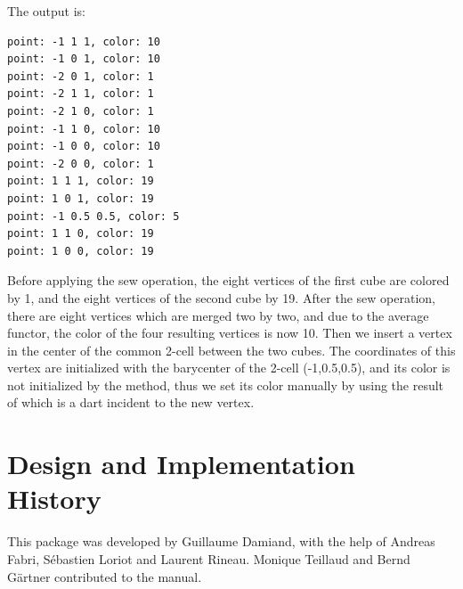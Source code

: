 
The output is:
\begin{verbatim}
point: -1 1 1, color: 10
point: -1 0 1, color: 10
point: -2 0 1, color: 1
point: -2 1 1, color: 1
point: -2 1 0, color: 1
point: -1 1 0, color: 10
point: -1 0 0, color: 10
point: -2 0 0, color: 1
point: 1 1 1, color: 19
point: 1 0 1, color: 19
point: -1 0.5 0.5, color: 5
point: 1 1 0, color: 19
point: 1 0 0, color: 19
\end{verbatim}

Before applying the sew operation, the eight vertices of the first
cube are colored by 1, and the eight vertices of the second cube by
19. After the sew operation, there are eight vertices which are merged
two by two, and due to the average functor, the color of the four
resulting vertices is now 10. Then we insert a vertex in the center
of the common 2-cell between the two cubes.  The coordinates of this
vertex are initialized with the barycenter of the 2-cell
(-1,0.5,0.5), and its color is not initialized by the method, thus we
set its color manually by using the result of
 which is a dart incident to the
new vertex.

\section{Design and Implementation History}

This package was developed by Guillaume Damiand, with the help of
Andreas Fabri, S\'ebastien Loriot and Laurent Rineau.  Monique
Teillaud and Bernd G{\"a}rtner contributed to the manual.
